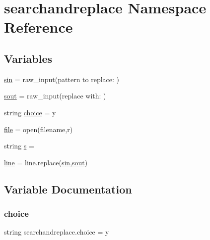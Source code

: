 \hypertarget{namespacesearchandreplace}{}\section{searchandreplace Namespace Reference}
\label{namespacesearchandreplace}
\subsection*{Variables}
\begin{DoxyCompactItemize}
\item 
\hyperlink{namespacesearchandreplace_a94b1c9b47ae4df2e0b988c70cc936242}{sin} = raw\+\_\+input(\textquotesingle{}pattern to replace\+: \textquotesingle{})
\item 
\hyperlink{namespacesearchandreplace_a76d696ba9b28913c6e3d1b4e390f476f}{sout} = raw\+\_\+input(\textquotesingle{}replace with\+: \textquotesingle{})
\item 
string \hyperlink{namespacesearchandreplace_a0e00fb8a11186dcd0a2ff80bb4528edb}{choice} = \textquotesingle{}y\textquotesingle{}
\item 
\hyperlink{namespacesearchandreplace_a114412d7b8faef4e0ca635eda48411f4}{file} = open(filename,\textquotesingle{}r\textquotesingle{})
\item 
string \hyperlink{namespacesearchandreplace_a513aa009601c326f2efa0718a5ea2a66}{s} = \textquotesingle{}\textquotesingle{}
\item 
\hyperlink{namespacesearchandreplace_a005b7c70485551a4006bed73684513f4}{line} = line.\+replace(\hyperlink{namespacesearchandreplace_a94b1c9b47ae4df2e0b988c70cc936242}{sin},\hyperlink{namespacesearchandreplace_a76d696ba9b28913c6e3d1b4e390f476f}{sout})
\end{DoxyCompactItemize}


\subsection{Variable Documentation}
\mbox{\label{namespacesearchandreplace_a0e00fb8a11186dcd0a2ff80bb4528edb}} 
\subsubsection{\texorpdfstring{choice}{choice}}
{\footnotesize\ttfamily string searchandreplace.\+choice = \textquotesingle{}y\textquotesingle{}}

